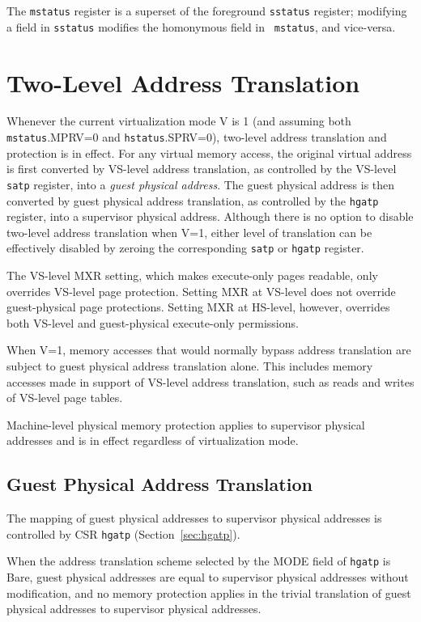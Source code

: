 The {\tt mstatus} register is a superset of the foreground {\tt sstatus}
register;
modifying a field in {\tt sstatus} modifies the homonymous field in {\tt
mstatus}, and vice-versa.

\section{Two-Level Address Translation}
\label{sec:two-level-translation}

Whenever the current virtualization mode V is 1 (and assuming both
{\tt mstatus}.MPRV=0 and {\tt hstatus}.SPRV=0), two-level address translation
and protection is in effect.
For any virtual memory access, the original virtual address is first converted
by VS-level address translation, as controlled by the VS-level {\tt satp}
register, into a {\em guest physical address}.
The guest physical address is then converted by guest physical address
translation, as controlled by the {\tt hgatp} register, into a supervisor
physical address.
Although there is no option to disable two-level address translation when V=1,
either level of translation can be effectively disabled by zeroing the
corresponding {\tt satp} or {\tt hgatp} register.

The VS-level MXR setting, which makes execute-only pages readable, only
overrides VS-level page protection.
Setting MXR at VS-level does not override guest-physical page protections.
Setting MXR at HS-level, however, overrides both VS-level and guest-physical
execute-only permissions.

When V=1, memory accesses that would normally bypass address translation are
subject to guest physical address translation alone.
This includes memory accesses made in support of VS-level address translation,
such as reads and writes of VS-level page tables.

Machine-level physical memory protection applies to supervisor physical
addresses and is in effect regardless of virtualization mode.

\subsection{Guest Physical Address Translation}
\label{sec:guest-addr-translation}

The mapping of guest physical addresses to supervisor physical addresses is
controlled by CSR {\tt hgatp} (Section~\ref{sec:hgatp}).

When the address translation scheme selected by the MODE field of {\tt hgatp}
is Bare, guest physical addresses are equal to supervisor physical addresses
without modification, and no memory protection applies in the trivial
translation of guest physical addresses to supervisor physical addresses.

